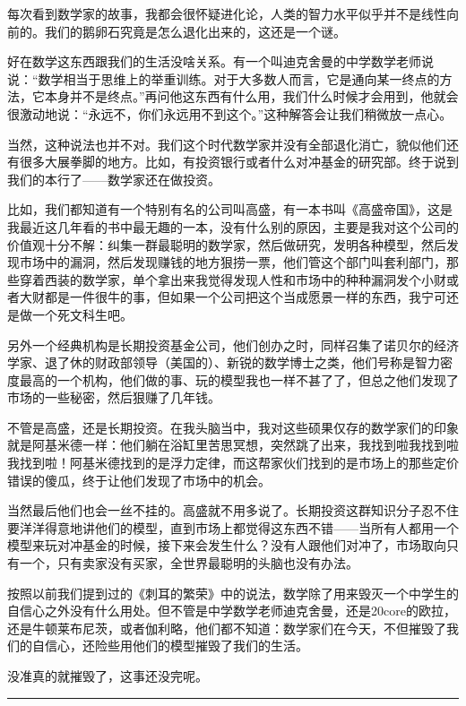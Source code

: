 每次看到数学家的故事，我都会很怀疑进化论，人类的智力水平似乎并不是线性向前的。我们的鹅卵石究竟是怎么退化出来的，这还是一个谜。

好在数学这东西跟我们的生活没啥关系。有一个叫迪克舍曼的中学数学老师说说：``数学相当于思维上的举重训练。对于大多数人而言，它是通向某一终点的方法，它本身并不是终点。''再问他这东西有什么用，我们什么时候才会用到，他就会很激动地说：``永远不，你们永远用不到这个。''这种解答会让我们稍微放一点心。

当然，这种说法也并不对。我们这个时代数学家并没有全部退化消亡，貌似他们还有很多大展拳脚的地方。比如，有投资银行或者什么对冲基金的研究部。终于说到我们的本行了------数学家还在做投资。

比如，我们都知道有一个特别有名的公司叫高盛，有一本书叫《高盛帝国》，这是我最近这几年看的书中最无趣的一本，没有什么别的原因，主要是我对这个公司的价值观十分不解：纠集一群最聪明的数学家，然后做研究，发明各种模型，然后发现市场中的漏洞，然后发现赚钱的地方狠捞一票，他们管这个部门叫套利部门，那些穿着西装的数学家，单个拿出来我觉得发现人性和市场中的种种漏洞发个小财或者大财都是一件很牛的事，但如果一个公司把这个当成愿景一样的东西，我宁可还是做一个死文科生吧。

另外一个经典机构是长期投资基金公司，他们创办之时，同样召集了诺贝尔的经济学家、退了休的财政部领导（美国的）、新锐的数学博士之类，他们号称是智力密度最高的一个机构，他们做的事、玩的模型我也一样不甚了了，但总之他们发现了市场的一些秘密，然后狠赚了几年钱。

不管是高盛，还是长期投资。在我头脑当中，我对这些硕果仅存的数学家们的印象就是阿基米德一样：他们躺在浴缸里苦思冥想，突然跳了出来，我找到啦我找到啦我找到啦！阿基米德找到的是浮力定律，而这帮家伙们找到的是市场上的那些定价错误的傻瓜，终于让他们发现了市场中的机会。

当然最后他们也会一丝不挂的。高盛就不用多说了。长期投资这群知识分子忍不住要洋洋得意地讲他们的模型，直到市场上都觉得这东西不错------当所有人都用一个模型来玩对冲基金的时候，接下来会发生什么？没有人跟他们对冲了，市场取向只有一个，只有卖家没有买家，全世界最聪明的头脑也没有办法。

按照以前我们提到过的《刺耳的繁荣》中的说法，数学除了用来毁灭一个中学生的自信心之外没有什么用处。但不管是中学数学老师迪克舍曼，还是20core的欧拉，还是牛顿莱布尼茨，或者伽利略，他们都不知道：数学家们在今天，不但摧毁了我们的自信心，还险些用他们的模型摧毁了我们的生活。

没准真的就摧毁了，这事还没完呢。

\begin{center}\rule{3in}{0.4pt}\end{center}

